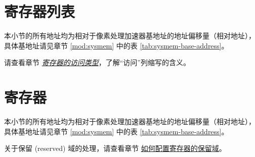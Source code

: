 \documentclass[main\_\_CN.tex]{subfiles}
\begin{document}



\newpage
\hypertarget{ppa-reg-summ}{}
\section{寄存器列表}
\label{sec:ppa-reg-summ}

本小节的所有地址均为相对于像素处理加速器基地址的地址偏移量（相对地址），具体基地址请见章节 \ref{mod:sysmem} \textit{} 中的表 \ref{tab:sysmem-base-address}。

请查看章节 \hyperref[glossary-access-types]{\textit{寄存器的访问类型}}，了解“访问”列缩写的含义。







\newpage
\section{寄存器}

本小节的所有地址均为相对于像素处理加速器基地址的地址偏移量（相对地址），具体基地址请见章节 \ref{mod:sysmem} \textit{} 中的表 \ref{tab:sysmem-base-address}。

关于保留 (reserved) 域的处理，请查看章节 \hyperref[programming-reserved-field]{如何配置寄存器的保留域}。



\end{document}
